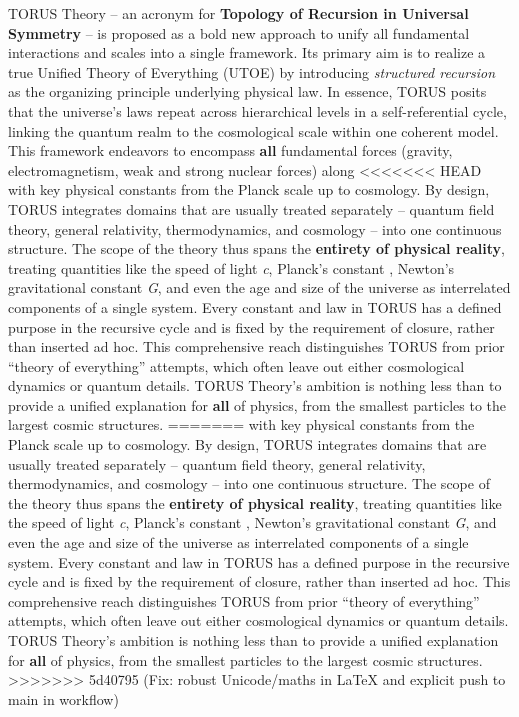 \documentclass[]{article}
\begin{document}
TORUS Theory -- an acronym for \textbf{Topology of Recursion in
Universal Symmetry} -- is proposed as a bold new approach to unify all
fundamental interactions and scales into a single framework. Its primary
aim is to realize a true Unified Theory of Everything (UTOE) by
introducing \emph{structured recursion} as the organizing principle
underlying physical law. In essence, TORUS posits that the universe's
laws repeat across hierarchical levels in a self-referential cycle,
linking the quantum realm to the cosmological scale within one coherent
model. This framework endeavors to encompass \textbf{all} fundamental
forces (gravity, electromagnetism, weak and strong nuclear forces) along
<<<<<<< HEAD
with key physical constants from the Planck scale up to
cosmology\hspace{0pt}. By design, TORUS integrates domains that are
usually treated separately -- quantum field theory, general relativity,
thermodynamics, and cosmology -- into one continuous structure. The
scope of the theory thus spans the \textbf{entirety of physical
reality}, treating quantities like the speed of light \emph{c}, Planck's
constant \emph{\hbar}, Newton's gravitational constant \emph{G}, and even
the age and size of the universe as interrelated components of a single
system. Every constant and law in TORUS has a defined purpose in the
recursive cycle and is fixed by the requirement of closure, rather than
inserted ad hoc\hspace{0pt}. This comprehensive reach distinguishes
TORUS from prior ``theory of everything'' attempts, which often leave
out either cosmological dynamics or quantum details. TORUS Theory's
ambition is nothing less than to provide a unified explanation for
\textbf{all} of physics, from the smallest particles to the largest
cosmic structures\hspace{0pt}.
=======
with key physical constants from the Planck scale up to cosmology​. By
design, TORUS integrates domains that are usually treated separately --
quantum field theory, general relativity, thermodynamics, and cosmology
-- into one continuous structure. The scope of the theory thus spans the
\textbf{entirety of physical reality}, treating quantities like the
speed of light \emph{c}, Planck's constant \emph{\hbar}, Newton's
gravitational constant \emph{G}, and even the age and size of the
universe as interrelated components of a single system. Every constant
and law in TORUS has a defined purpose in the recursive cycle and is
fixed by the requirement of closure, rather than inserted ad hoc​. This
comprehensive reach distinguishes TORUS from prior ``theory of
everything'' attempts, which often leave out either cosmological
dynamics or quantum details. TORUS Theory's ambition is nothing less
than to provide a unified explanation for \textbf{all} of physics, from
the smallest particles to the largest cosmic structures​.
>>>>>>> 5d40795 (Fix: robust Unicode/maths in LaTeX and explicit push to main in workflow)
\end{document}
